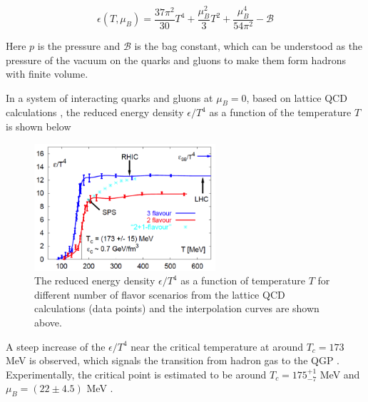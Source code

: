 \begin{equation}
\epsilon(T,\mu_B) = \frac{37\pi^2}{30} T^4 + \frac{\mu_B^2}{3}T^2 + \frac{\mu_B^4}{54\pi^2} -  \mathcal{B}
\end{equation}

Here $p$ is the pressure and $\mathcal{B}$ is the bag constant, which can be understood as the pressure of the vacuum on the quarks and gluons to make them form hadrons with finite volume.

In a system of interacting quarks and gluons at $\mu_B=0$, based on lattice QCD calculations \cite{LatticeQGP}, the reduced energy density $\epsilon/T^4$ as a function of the temperature $T$ is shown below


\begin{figure}[hbtp]
\begin{center}
\includegraphics[width=0.60\textwidth]{Figures/Chapter1/LQCDNew.png}
\caption{The reduced energy density $\epsilon/T^4$ as a function of temperature $T$ for different number of flavor scenarios from the lattice QCD calculations (data points) and the interpolation curves are shown above.}
\label{QCDPhaseDiagram}
\end{center}
\end{figure} 


A steep increase of the $\epsilon/T^4$ near the critical temperature at around $T_c  = 173$ MeV is observed, which signals the transition from hadron gas to the QGP \cite{PhaseTrans}. Experimentally, the critical point is estimated to be around $T_c = 175^{+1}_{-7}$ MeV and $\mu_B = (22 \pm 4.5)$ MeV \cite{CriticalPointEX} .






